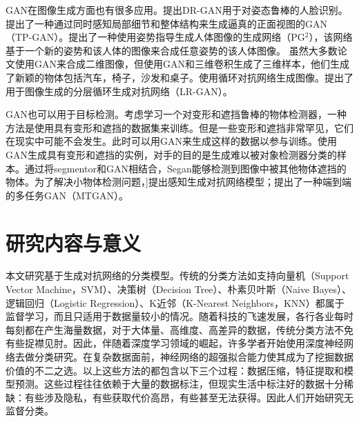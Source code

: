 GAN在图像生成方面也有很多应用。\citet{tran2017disentangled}提出DR-GAN用于对姿态鲁棒的人脸识别。\citet{huang2017beyond}提出了一种通过同时感知局部细节和整体结构来生成逼真的正面视图的GAN（TP-GAN）。\citet{ma2017pose}提出了一种使用姿势指导生成人体图像的生成网络（PG$^2$），该网络基于一个新的姿势和该人体的图像来合成任意姿势的该人体图像。
虽然大多数论文使用GAN来合成二维图像\cite{bao2017cvae,dong2017semantic}，但\citet{wu2016learning}使用GAN和三维卷积生成了三维样本，他们生成了新颖的物体包括汽车，椅子，沙发和桌子。\citet{im2016generating}使用循环对抗网络生成图像。\citet{yang2017lr}提出了用于图像生成的分层循环生成对抗网络（LR-GAN）。

GAN也可以用于目标检测。考虑学习一个对变形和遮挡鲁棒的物体检测器，一种方法是使用具有变形和遮挡的数据集来训练。但是一些变形和遮挡非常罕见，它们在现实中可能不会发生。此时可以用GAN来生成这样的数据以参与训练。\citet{wang2017fast}使用GAN生成具有变形和遮挡的实例，对手的目的是生成难以被对象检测器分类的样本。通过将segmentor和GAN相结合，Segan\cite{ehsani2018segan}能够检测到图像中被其他物体遮挡的物体。为了解决小物体检测问题，\citet{li2017perceptual}]提出感知生成对抗网络模型；\citet{bai2018sod}提出了一种端到端的多任务GAN（MTGAN）。

\section{研究内容与意义}
本文研究基于生成对抗网络的分类模型。传统的分类方法如支持向量机（Support Vector Machine，SVM）、决策树（Decision Tree）、朴素贝叶斯（Naive Bayes）、逻辑回归（Logistic Regression）、K近邻（K-Nearest Neighbors，KNN）都属于监督学习，而且只适用于数据量较小的情况。随着科技的飞速发展，各行各业每时每刻都在产生海量数据，对于大体量、高维度、高差异的数据，传统分类方法不免有些捉襟见肘。因此，伴随着深度学习领域的崛起，许多学者开始使用深度神经网络去做分类研究\cite{krizhevsky2012imagenet,taigman2014deepface}。在复杂数据面前，神经网络的超强拟合能力使其成为了挖掘数据价值的不二之选。以上这些方法的都包含以下三个过程：数据压缩，特征提取和模型预测。这些过程往往依赖于大量的数据标注，但现实生活中标注好的数据十分稀缺：有些涉及隐私，有些获取代价高昂，有些甚至无法获得。因此人们开始研究无监督分类。

